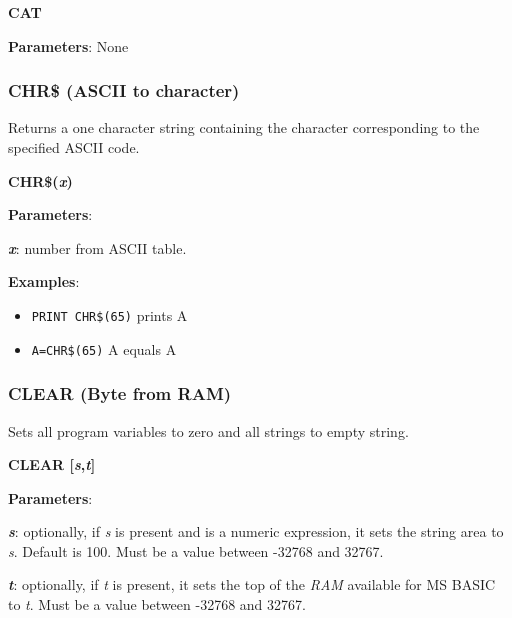     \hspace{1.9cm}\textbf{CAT}

    \textbf{Parameters}: None

    \subsubsection{{CHR\$ (ASCII to character)}}
    \label{msbasic:lang:chr}
    Returns a one character string containing the character corresponding to
    the specified ASCII code.

    \hspace{1.9cm}\textbf{CHR\$(\textit{x})}

    \textbf{Parameters}:

    \hspace{1cm}\textbf{\textit{x}}: number from ASCII table.

    \textbf{Examples}:
    \begin{itemize}
        \item \texttt{PRINT CHR\$(65)} prints A
        \item \texttt{A=CHR\$(65)} A equals A
    \end{itemize}

    \subsubsection{{CLEAR (Byte from RAM)}}
    \label{msbasic:lang:clear}
    Sets all program variables to zero and all strings to empty string.

    \hspace{1.9cm}\textbf{CLEAR [\textit{s},\textit{t}]}

    \textbf{Parameters}:

    \hspace{1cm}\textbf{\textit{s}}: optionally, if \textit{s} is present and is
    a numeric expression, it sets the string area to \textit{s}. Default is 100.
    Must be a value between -32768 and 32767.

    \hspace{1cm}\textbf{\textit{t}}: optionally, if \textit{t} is present, it
    sets the top of the \textit{RAM} available for MS BASIC to \textit{t}.
    Must be a value between -32768 and 32767.

